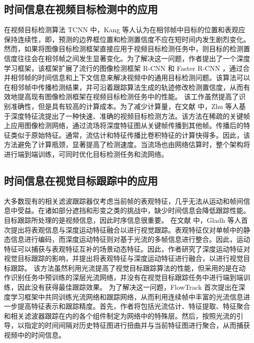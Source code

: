 \subsection{时间信息在视频目标检测中的应用}
在视频目标检测算法 TCNN \cite{TCNN} 中，Kang 等人认为在相邻帧中目标的位置和表观应保持连续性，即，预测的边界框位置和检测置信度不应在短时间内发生剧烈变化。然而，如果将图像目标检测框架直接应用于视频目标检测任务中，则目标的检测置信度往往会在相邻帧之间发生显著变化。为了解决这一问题，作者提出了一个深度学习框架，该框架扩展了流行的图像检测框架 R-CNN \cite{girshick2014rich} 和 Faster R-CNN \cite{ren2015faster}，通过合并相邻帧的时间信息和上下文信息来解决视频中的通用目标检测问题。该算法可以在相邻帧中传播检测结果，并可沿着跟踪算法生成的轨迹修改检测置信度，从而有效地提高现有图像检测框架在视频目标检测任务中的性能。%
该工作虽然提高了识别准确性，但是具有较高的计算成本。为了减少计算量，在文献 \cite{DeepFeature} 中，Zhu 等人基于深度特征流提出了一种快速、准确的视频目标检测方法。该方法在稀疏的关键帧上应用图像检测网络，通过流场将深度特征图从关键帧传播到其他帧。传播后的特征类似于原始特征。通常，流估计和特征传播比卷积特征的计算快得多。因此，该方法避免了计算瓶颈，显著提高了检测速度。当流场也由网络估算时，整个架构将进行端到端训练，可同时优化目标检测任务和流网络。%
\subsection{时间信息在视觉目标跟踪中的应用}
大多数现有的相关滤波跟踪器仅考虑当前帧的表观特征，几乎无法从运动和帧间信息中受益。在诸如部分遮挡和形变之类的挑战中，缺少时间信息会降低跟踪性能。目标跟踪所处理的是视频信息，因此时序信息很重要。
在文献 \cite{gladh2016deep} 中，Gladh 等人首次提出将表观信息与深度运动特征融合以进行视觉跟踪。表观特征仅对单帧中的静态信息进行编码，而深度运动特征则对基于光流的多帧信息进行整合。因此，运动特征可以捕获与表观特征互补的场景动态特征。因此，作者研究了深度运动特征对视觉目标跟踪的影响，并提出将表观特征与深度运动特征进行融合，以进行视觉目标跟踪。
该方法虽然利用光流提高了视觉目标跟踪算法的性能，但采用的是在动作识别任务中预训练的深层光流网络，并没有在视觉目标跟踪任务中进行端到端训练，因此没有获得最佳跟踪效果。
为了解决这一问题，FlowTrack \cite{FlowTrack} 首次提出在深度学习框架中共同训练光流网络和跟踪网络，从而利用连续帧中丰富的光流信息进一步提高特征表示和跟踪精度。首先，作者将包括光流估计、特征提取、特征聚合和相关滤波器跟踪在内的各个组件制定为网络中的特殊层。然后，按照光流的引导，以指定的时间间隔对历史特征图进行扭曲并与当前特征图进行聚合，从而捕获视频中的时间信息。

